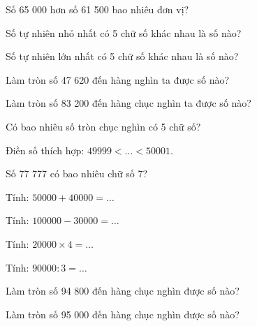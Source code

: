 \begin{ex}
Số 65 000 hơn số 61 500 bao nhiêu đơn vị?
\end{ex}

\begin{ex}
Số tự nhiên nhỏ nhất có 5 chữ số khác nhau là số nào?
\end{ex}

\begin{ex}
Số tự nhiên lớn nhất có 5 chữ số khác nhau là số nào?
\end{ex}

\begin{ex}
Làm tròn số 47 620 đến hàng nghìn ta được số nào?
\end{ex}

\begin{ex}
Làm tròn số 83 200 đến hàng chục nghìn ta được số nào?
\end{ex}

\begin{ex}
Có bao nhiêu số tròn chục nghìn có 5 chữ số?
\end{ex}

\begin{ex}
Điền số thích hợp: $49999 < \dots < 50001$.
\end{ex}

\begin{ex}
Số 77 777 có bao nhiêu chữ số 7?
\end{ex}

\begin{ex}
Tính: $50000 + 40000 = \dots$
\end{ex}

\begin{ex}
Tính: $100000 - 30000 = \dots$
\end{ex}

\begin{ex}
Tính: $20000 \times 4 = \dots$
\end{ex}

\begin{ex}
Tính: $90000 : 3 = \dots$
\end{ex}

\begin{ex}
Làm tròn số 94 800 đến hàng chục nghìn được số nào?
\end{ex}

\begin{ex}
Làm tròn số 95 000 đến hàng chục nghìn được số nào?
\end{ex}
